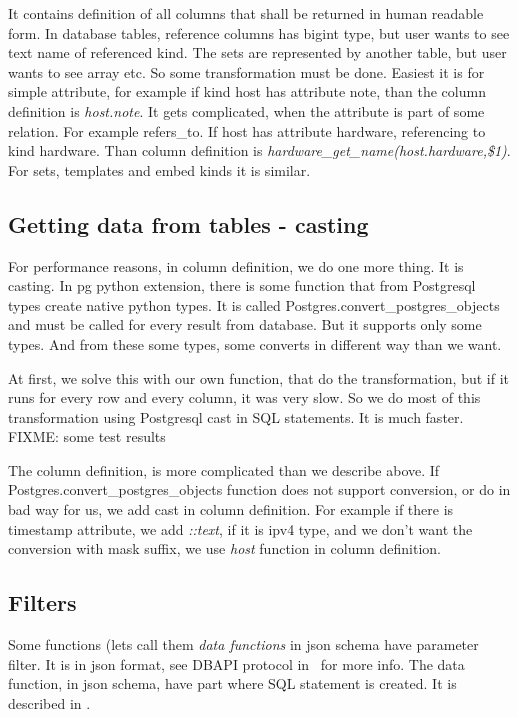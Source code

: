 \documentclass[deska]{subfiles}
\begin{document}
It contains definition of all columns that shall be returned in human readable form.
In database tables, reference columns has bigint type, but user wants to see text name of referenced kind.
The sets are represented by another table, but user wants to see array etc. So some transformation must be done.
Easiest it is for simple attribute,
for example if kind host has attribute note, than the column definition is {\em host.note}.
It gets complicated, when the attribute is part of some relation. For example refers\_to.
If host has attribute hardware, referencing to kind hardware. Than column definition is 
{\em hardware\_get\_name(host.hardware,\$1)}. For sets, templates and embed kinds it is similar.

\subsection{Getting data from tables - casting}
\label{sec:cast}
For performance reasons, in column definition, we do one more thing. It is casting.
In pg python extension, there is some function that from Postgresql types create native python types.
It is called Postgres.convert\_postgres\_objects
and must be called for every result from database. But it supports only some types.
And from these some types, some converts in different way than we want.

At first, we solve this with our own function, that do the transformation, but if it runs for every
row and every column, it was very slow. So we do most of this transformation using Postgresql cast
in SQL statements. It is much faster.
FIXME: some test results

The column definition, is more complicated than we describe above. If
Postgres.convert\_postgres\_objects function 
does not support conversion, or do in bad way for us, we add cast in column definition.
For example if there is timestamp attribute, we add {\em ::text}, if it is ipv4 type, and we don't want
the conversion with mask suffix, we use {\em host} function in column definition.


\subsection{Filters}

Some functions (lets call them {\em data functions} in json schema have parameter filter. It is in json format,
see DBAPI protocol in~ for more info.
The data function, in json schema, have part where SQL statement is created. It is described in
.
\end{document}
